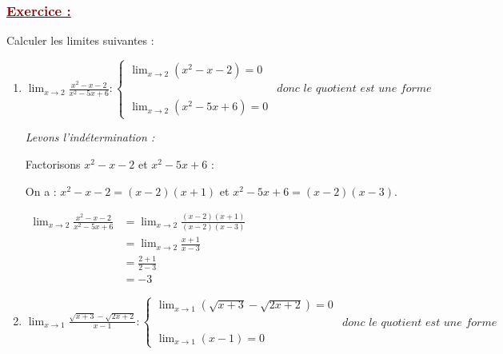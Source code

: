 \documentclass[12pt,a4paper]{article}
\begin{document}
\subsubsection*{\underline{\textcolor{darkred}{ Exercice : }}}

Calculer les limites suivantes :
\vspace{0.3cm}

\begin{enumerate}
    \item 
    $
    \displaystyle \lim_{x \to 2} \frac{x^2 - x - 2}{x^2 - 5x + 6}:
    \begin{cases}
    \displaystyle \lim_{x \to 2} (x^2 - x - 2) = 0\\[3mm]
    &\textit{donc le quotient est une forme indéterminée.}\\
    \displaystyle \lim_{x \to 2} (x^2 - 5x + 6) = 0
    \end{cases}
    $

    \textit{Levons l'indétermination :}
    
    Factorisons $x^2 - x - 2$ et $x^2 - 5x + 6$ :
    
    On a : $x^2 - x - 2 = (x - 2)(x + 1)$ et $x^2 - 5x + 6 = (x - 2)(x - 3)$.
    
    $
    \begin{aligned}
    \displaystyle \lim_{x \to 2} \frac{x^2 - x - 2}{x^2 - 5x + 6} &= \displaystyle \lim_{x \to 2} \frac{(x - 2)(x + 1)}{(x - 2)(x - 3)}\\
    &= \displaystyle \lim_{x \to 2} \frac{x + 1}{x - 3}\\
    &= \frac{2 + 1}{2 - 3}\\
    &= -3
    \end{aligned}
    $
    
     

    \vspace{0.6cm}

    \item 
    $
    \displaystyle \lim_{x \to 1} \frac{\sqrt{x + 3} - \sqrt{2x + 2}}{x - 1}:
    \begin{cases}
    \displaystyle \lim_{x \to 1} (\sqrt{x + 3} - \sqrt{2x + 2}) = 0\\[3mm]
    &\textit{donc le quotient est une forme indéterminée.}\\
    \displaystyle \lim_{x \to 1} (x - 1) = 0
    \end{cases}
    $


\end{enumerate}
\end{document}

